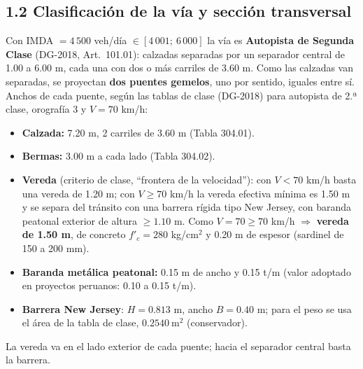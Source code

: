 \documentclass[11pt,a4paper]{article}
\begin{document}
\subsection*{1.2 Clasificación de la vía y sección transversal}
Con IMDA $= 4\,500$ veh/día $\in [4\,001;\ 6\,000]$ la vía es \textbf{Autopista de Segunda Clase} (DG-2018, Art.~101.01):
calzadas separadas por un separador central de 1.00 a 6.00 m, cada una con dos o más carriles de 3.60 m.
Como las calzadas van separadas, se proyectan \textbf{dos puentes gemelos}, uno por sentido, iguales entre sí.
Anchos de cada puente, según las tablas de clase (DG-2018) para autopista de 2.ª clase, orografía 3 y
$V = 70$ km/h:
\begin{itemize}[leftmargin=*,itemsep=1pt]
\item \textbf{Calzada:} 7.20 m, 2 carriles de 3.60 m (Tabla 304.01).
\item \textbf{Bermas:} 3.00 m a cada lado (Tabla 304.02).
\item \textbf{Vereda} (criterio de clase, ``frontera de la velocidad''): con $V < 70$ km/h basta una vereda de 1.20 m;
  con $V \ge 70$ km/h la vereda efectiva mínima es 1.50 m y se separa del tránsito con una barrera rígida tipo
  New Jersey, con baranda peatonal exterior de altura $\ge 1.10$ m. Como $V = 70 \ge 70$ km/h
  $\Rightarrow$ \textbf{vereda de 1.50 m}, de concreto $f'_c = 280$ kg/cm$^2$ y 0.20 m de espesor
  (sardinel de 150 a 200 mm).
\item \textbf{Baranda metálica peatonal:} 0.15 m de ancho y 0.15 t/m (valor adoptado en proyectos
  peruanos: 0.10 a 0.15 t/m).
\item \textbf{Barrera New Jersey}: $H = 0.813$ m, ancho $B = 0.40$ m; para el peso se usa el área de la
  tabla de clase, $0.2540\ \mathrm{m^2}$ (conservador).
\end{itemize}
La vereda va en el lado exterior de cada puente; hacia el separador central basta la barrera.
\end{document}

